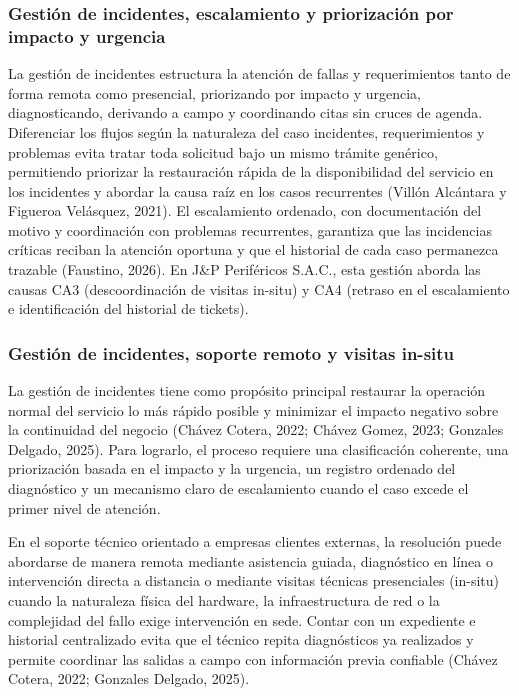 \subsubsection{Gestión de incidentes, escalamiento y priorización por impacto y urgencia}
La gestión de incidentes estructura la atención de fallas y requerimientos tanto de forma remota como presencial, priorizando por impacto y urgencia, diagnosticando, derivando a campo y coordinando citas sin cruces de agenda. Diferenciar los flujos según la naturaleza del caso incidentes, requerimientos y problemas evita tratar toda solicitud bajo un mismo trámite genérico, permitiendo priorizar la restauración rápida de la disponibilidad del servicio en los incidentes y abordar la causa raíz en los casos recurrentes (Villón Alcántara y Figueroa Velásquez, 2021). El escalamiento ordenado, con documentación del motivo y coordinación con problemas recurrentes, garantiza que las incidencias críticas reciban la atención oportuna y que el historial de cada caso permanezca trazable (Faustino, 2026). En J\&P Periféricos S.A.C., esta gestión aborda las causas CA3 (descoordinación de visitas in-situ) y CA4 (retraso en el escalamiento e identificación del historial de tickets).

\subsubsection{Gestión de incidentes, soporte remoto y visitas in-situ}
La gestión de incidentes tiene como propósito principal restaurar la operación normal del servicio lo más rápido posible y minimizar el impacto negativo sobre la continuidad del negocio (Chávez Cotera, 2022; Chávez Gomez, 2023; Gonzales Delgado, 2025). Para lograrlo, el proceso requiere una clasificación coherente, una priorización basada en el impacto y la urgencia, un registro ordenado del diagnóstico y un mecanismo claro de escalamiento cuando el caso excede el primer nivel de atención.

En el soporte técnico orientado a empresas clientes externas, la resolución puede abordarse de manera remota mediante asistencia guiada, diagnóstico en línea o intervención directa a distancia o mediante visitas técnicas presenciales (in-situ) cuando la naturaleza física del hardware, la infraestructura de red o la complejidad del fallo exige intervención en sede. Contar con un expediente e historial centralizado evita que el técnico repita diagnósticos ya realizados y permite coordinar las salidas a campo con información previa confiable (Chávez Cotera, 2022; Gonzales Delgado, 2025).

